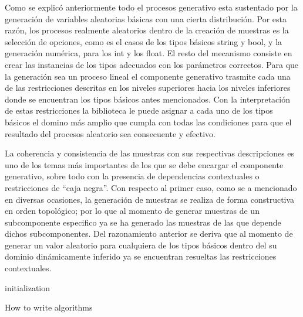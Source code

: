 Como se explicó anteriormente todo el procesos generativo esta sustentado por la generación de variables aleatorias básicas
con una cierta distribución. Por esta razón, los procesos realmente aleatorios dentro de la creación de muestras es la
selección de opciones, como es el casos de los tipos básicos string y bool, y la generación numérica, para los int y los
float. El resto del mecanismo consiste en crear las instancias de los tipos adecuados con los parámetros correctos. Para que
la generación sea un proceso lineal el componente generativo trasmite cada una de las restricciones descritas en los niveles
superiores hacia los niveles inferiores donde se encuentran los tipos básicos antes mencionados. Con la interpretación de
estas restricciones la biblioteca le puede asignar a cada uno de los tipos básicos el domino más amplio que cumpla con todas
las condiciones para que el resultado del procesos aleatorio sea consecuente y efectivo.

La coherencia y consistencia de las muestras con sus respectivas descripciones es uno de los temas más importantes de los que
se debe encargar el componente generativo, sobre todo con la presencia de dependencias contextuales o restricciones de
“caja negra”. Con respecto al primer caso, como se a mencionado en diversas ocasiones, la generación de muestras se realiza
de forma constructiva en orden topológico; por lo que al momento de generar muestras de un subcomponente especifico ya se ha
generado las muestras de las que depende dichos subcomponentes. Del razonamiento anterior se deriva que al momento de generar
un valor aleatorio para cualquiera de los tipos básicos dentro del su dominio dinámicamente inferido ya se encuentran resueltas
las restricciones contextuales.


\begin{algorithm}[H]
    \SetAlgoLined
    initialization\;
    \caption{How to write algorithms}
\end{algorithm}



